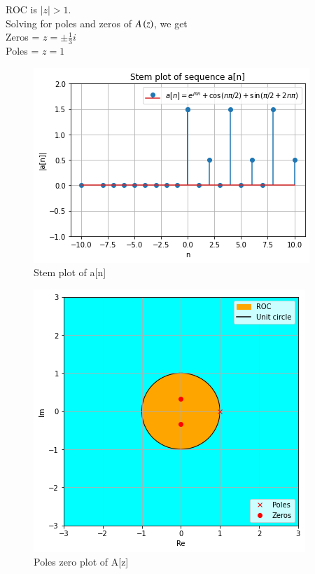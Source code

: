 \documentclass[journal,12pt,twocolumn]{IEEEtran}
\begin{document}
ROC is $|z|>1$.\\
Solving for poles and zeros of $A\left(z\right)$, we get\\
Zeros = $z = \pm \frac{1}{3}i$\\
Poles = $z = 1$
\begin{figure}[h]
\centering
\caption{Stem plot of a[n]}
\includegraphics[width = \columnwidth]{q2_quiz2}
\end{figure}
\begin{figure}[h]
\centering
\caption{Poles zero plot of A[z]}
\includegraphics[width = \columnwidth]{q2_quiz_2}
\end{figure}
\end{document}
